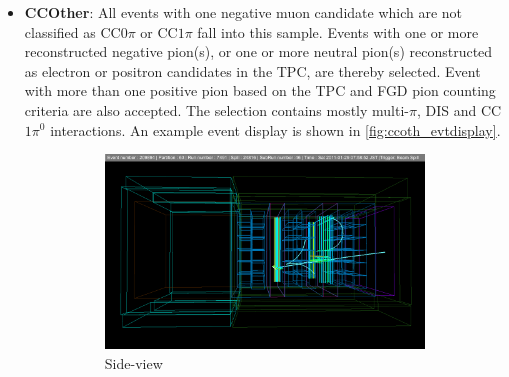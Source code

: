 \begin{itemize}
	\item \textbf{CCOther}: All events with one negative muon candidate which are not classified as CC0$\pi$ or CC$1\pi$ fall into this sample. Events with one or more reconstructed negative pion(s), or one or more neutral pion(s) reconstructed as electron or positron candidates in the TPC, are thereby selected. Event with more than one positive pion based on the TPC and FGD pion counting criteria are also accepted. The selection contains mostly multi-$\pi$, DIS and CC$1\pi^0$ interactions. An example event display is shown in \autoref{fig:ccoth_evtdisplay}.
	\begin{figure}[h]
		\begin{subfigure}[t]{0.49\textwidth}
			\includegraphics[width=\textwidth, trim={20mm 30mm 20mm 30mm}, clip ]{figures/numu/evtdisplay/CCOthers_7491_46_209894_perX0Z_all}
			\caption{Side-view}
		\end{subfigure}
		\begin{subfigure}[t]{0.49\textwidth}

\end{subfigure}
\end{figure}
\end{itemize}
